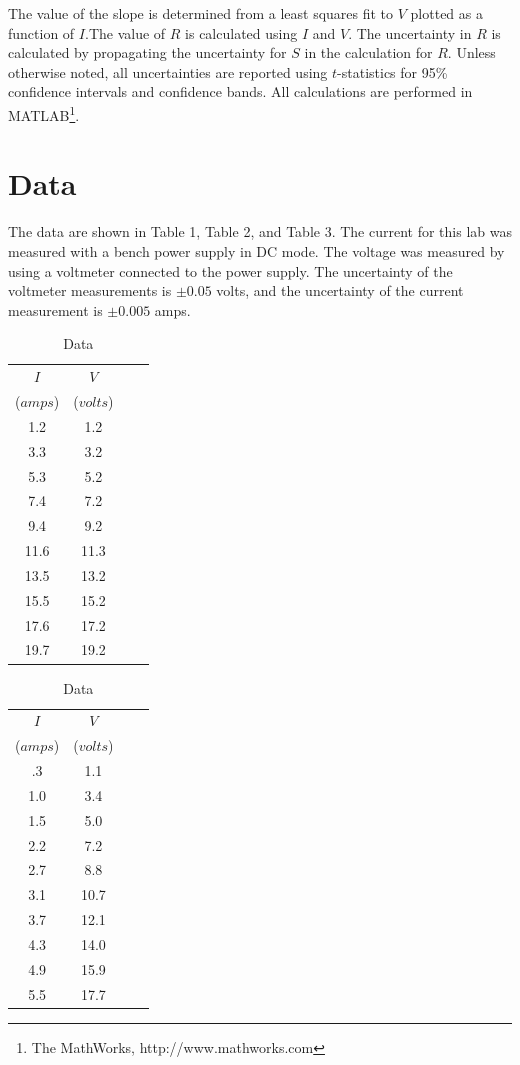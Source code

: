 \documentclass[onecolumn]{article}
\begin{document}
The value of the slope is determined from a least squares fit to $V$ plotted as a function of $I$.The value of $R$ is calculated using $I$ and $V$. The uncertainty in $R$ is calculated by propagating the uncertainty for $S$ in the calculation for $R$. Unless otherwise noted, all uncertainties are reported using $t$-statistics for 95\% confidence intervals and confidence bands. All calculations are performed in MATLAB\footnote{The MathWorks, http://www.mathworks.com}.

\section*{Data}

The data are shown in Table 1, Table 2, and Table 3. The current for this lab was measured with a bench power supply in DC mode. The voltage was measured by using a voltmeter connected to the power supply. The uncertainty of the voltmeter measurements is $\pm0.05$ volts, and the uncertainty of the current measurement is $\pm0.005$ amps.

\begin{table}[htbp!]
\centering
\caption{Data}
\begin{tabular}{cccc}
\hline\hline
$I$ & $V$ \\
($amps$) & ($volts$) \\
\hline
1.2 & 1.2 \\
3.3 & 3.2 \\
5.3 & 5.2 \\
7.4 & 7.2 \\
9.4 & 9.2 \\
11.6 & 11.3 \\
13.5 & 13.2 \\
15.5 & 15.2 \\
17.6 & 17.2 \\
19.7 & 19.2 \\
\hline
\end{tabular}
\end{table}

\begin{table}[htbp!]
\centering
\caption{Data}
\begin{tabular}{cccc}
\hline\hline
$I$ & $V$ \\
($amps$) & ($volts$) \\
\hline
.3 & 1.1 \\
1.0 & 3.4 \\
1.5 & 5.0 \\
2.2 & 7.2 \\
2.7 & 8.8 \\
3.1 & 10.7 \\
3.7 & 12.1 \\
4.3 & 14.0 \\
4.9 & 15.9 \\
5.5 & 17.7 \\
\hline
\end{tabular}
\end{table}
\end{document}
